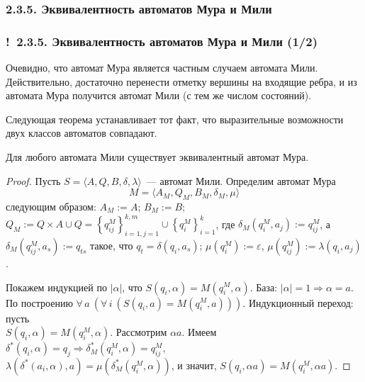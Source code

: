 \documentclass[mathserif,12pt,aspectratio=169]{beamer}
\def\Assign{\operatorname{:=}}
\def\A#1#2{\forall\,#1\ \left(#2\right)}
\let\Impl\Longrightarrow
\def\Ok{{\color{green}\textbf{!}\ }}
\begin{document}
\subsubsection{2.3.5. Эквивалентность автоматов Мура и Мили}
\begin{frame}
\frametitle{\Ok 2.3.5. Эквивалентность автоматов Мура и Мили (1/2)}
Очевидно, что автомат Мура является частным случаем автомата Мили.
Действительно, достаточно перенести отметку вершины на входящие
ребра, и из автомата Мура получится автомат Мили (с тем же числом
состояний).

Следующая теорема устанавливает тот факт, что выразительные
возможности двух классов автоматов совпадают.

\begin{theorem}
Для любого автомата Мили существует эквивалентный автомат Мура.
\end{theorem}

\begin{proof}
Пусть $S=\langle A, Q, B, \delta, \lambda\rangle$~--- автомат
Мили. Определим автомат Мура
$$
M= \langle A_M, Q_M, B_M,
\delta_M,\mu\rangle
$$
следующим образом:
$A_M\Assign A$;
$B_M\Assign B$;
$Q_M\Assign Q\times A \cup Q =
\left\{q^M_{ij}\right\}^{k,m}_{i=1, j=1} \cup
\left\{q^M_i\right\}^k_{i=1}$, где $\delta_M(q_i^M, a_j)\Assign
q^M_{ij}$, а $\delta_M(q^M_{ij}, a_s)\Assign q_{ts}$ такое, что $q_t
= \delta(q_i, a_s)$;
$\mu(q^M_i)\!\Assign\! \varepsilon$,
$\mu(q^M_{ij})\!\Assign\!\lambda(q_i, a_j)$.

Покажем индукцией по $|\alpha|$, что $S(q_i, \alpha)=
M(q_i^M,\alpha)$. База: $|\alpha|=1\Impl \alpha =a$. По построению
$\A{a}{\A{i}{ S(q_i, a)= M(q_i^M, a)}}$. Индукционный переход: пусть \\$S(q_i, \alpha)=
M(q_i^M,\alpha)$. Рассмотрим $\alpha a$. Имеем $\delta^*(q_i,\alpha)
= q_j \Impl \delta_M^*(q_i^M,\alpha)= q^M_{ij}$,\\
$\lambda(\delta^*(a_i,\alpha), a) = \mu(\delta_M^*(q_i^M, \alpha))$, и
значит, $S(q_i, \alpha a)= M(q_i^M, \alpha a)$.
\end{proof}
\end{frame}
\end{document}
